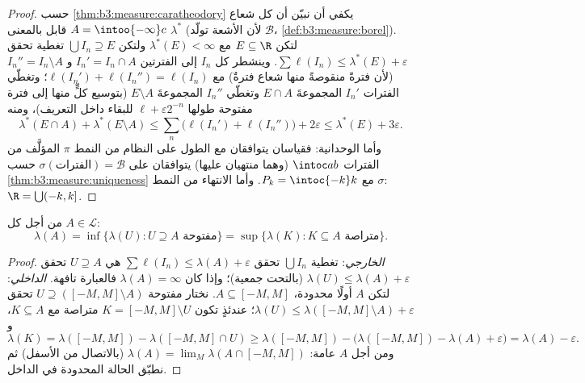 \begin{proof}
حسب \cref{thm:b3:measure:caratheodory} يكفي أن نبيّن أن كل شعاع $A = \intoo{-\infty}c$ قابل 
بالمعنى $\lambda^*$ (لأن الأشعة تولّد $\mathcal B$،
\cref{def:b3:measure:borel}). لتكن $E \subseteq \R$ مع $\lambda^*(E) < \infty$ ولتكن $\bigcup I_n \supseteq E$
تغطية تحقق $\sum\ell(I_n) \leq \lambda^*(E) + \varepsilon$. وينشطر كل $I_n$ إلى الفترتين $I_n' = I_n \cap A$
و $I_n'' = I_n\setminus A$ (لأن فترةً منقوصةً منها شعاع فترةٌ) مع $\ell(I_n') + \ell(I_n'') = \ell(I_n)$؛ وتغطّي
الفترات $I_n'$ المجموعةَ $E \cap A$ وتغطّي $I_n''$ المجموعةَ
$E \setminus A$ (بتوسيع كلٍّ منها إلى فترة مفتوحة طولها $\ell +
\varepsilon2^{-n}$
للبقاء داخل التعريف)، ومنه
\[
\lambda^*(E\cap A) + \lambda^*(E\setminus A)
\leq \sum_n\bigl(\ell(I_n') + \ell(I_n'')\bigr) + 2\varepsilon
\leq \lambda^*(E) + 3\varepsilon .
\]
وأما الوحدانية: فقياسان يتوافقان مع الطول على النظام من النمط
$\pi$ المؤلَّف من الفترات $\intoc ab$ (وهما منتهيان عليها)
يتوافقان على $\sigma(\text{الفترات}) = \mathcal B$ حسب \cref{thm:b3:measure:uniqueness} مع $P_k = \intoc{-k}k$. وأما الانتهاء
من النمط $\sigma$: $\R = \bigcup(-k, k]$.
\end{proof}

\begin{theorem}[الانتظام]\label{thm:b3:measure:regularity}
من أجل كل $A \in \mathcal L$:
\[
\lambda(A) = \inf\{\lambda(U) : U \supseteq A \text{ مفتوحة}\}
= \sup\{\lambda(K) : K \subseteq A \text{ متراصة}\}.
\]
\end{theorem}

\begin{proof}
\emph{الخارجي}: تغطية $\bigcup I_n$ تحقق $\sum\ell(I_n) \leq
\lambda(A) + \varepsilon$ هي  $U \supseteq A$ تحقق $\lambda(U) \leq \lambda(A) + \varepsilon$ (بالتحت جمعية)؛ وإذا كان
$\lambda(A) = \infty$ فالعبارة تافهة. \emph{الداخلي}: لتكن $A$ أولًا محدودة،
$A \subseteq [-M, M]$. نختار مفتوحة $U \supseteq ([-M,M]\setminus A)$ تحقق $\lambda(U) \leq
\lambda([-M,M]\setminus A) + \varepsilon$؛ عندئذٍ تكون $K = [-M,
M]\setminus U$
متراصة مع $K \subseteq A$، و
\[
\lambda(K) = \lambda([-M,M]) - \lambda([-M,M]\cap U)
\geq \lambda([-M,M]) - \bigl(\lambda([-M,M]) - \lambda(A) +
\varepsilon\bigr) = \lambda(A) - \varepsilon .
\]
ومن أجل $A$ عامة: $\lambda(A) = \lim_M\lambda(A\cap[-M,M])$ (بالاتصال من الأسفل) ثم نطبّق الحالة
المحدودة في الداخل.
\end{proof}


